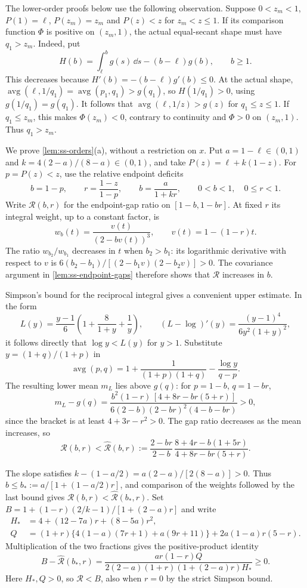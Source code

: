  The lower-order proofs below use the following observation.
Suppose $0<z_m<1$, $P(1)=\ell$, $P(z_m)=z_m$ and $P(z)<z$ for $z_m<z\le1$.
If its comparison function $\Phi$ is positive on $(z_m,1)$, the actual equal-secant shape
must have $q_1>z_m$. Indeed, put
\[
 H(b)=\int_\ell^b g(s)\,\dd s-(b-\ell)g(b),\qquad b\ge1.
\]
This decreases because $H'(b)=-(b-\ell)g'(b)\le0$.
At the actual shape, $\operatorname{avg}(\ell,1/q_1)=\operatorname{avg}(p_1,q_1)>g(q_1)$,
so $H(1/q_1)>0$, using $g(1/q_1)=g(q_1)$.
It follows that $\operatorname{avg}(\ell,1/z)>g(z)$ for $q_1\le z\le1$.
If $q_1\le z_m$, this makes $\Phi(z_m)<0$, contrary to continuity and
$\Phi>0$ on $(z_m,1)$. Thus $q_1>z_m$.

 We prove \cref{lem:ss-orders}(a), without a restriction on $x$.
Put $a=1-\ell\in(0,1)$ and $k=4(2-a)/(8-a)\in(0,1)$, and take $P(z)=\ell+k(1-z)$.
For $p=P(z)<z$, use the relative endpoint deficits
\[
 b=1-p,\qquad r=\frac{1-z}{1-p},\qquad
 b=\frac{a}{1+kr},\qquad 0<b<1,\quad 0\le r<1.
\]
Write $\mathcal R(b,r)$ for the endpoint-gap ratio on $[1-b,1-br]$.
At fixed $r$ its integral weight, up to a constant factor, is
\[
 w_b(t)=\frac{v(t)}{(2-bv(t))^3},\qquad v(t)=1-(1-r)t.
\]
The ratio $w_{b_2}/w_{b_1}$ decreases in $t$ when $b_2>b_1$: its logarithmic derivative
with respect to $v$ is $6(b_2-b_1)/[(2-b_1v)(2-b_2v)]>0$.
The covariance argument in \cref{lem:ss-endpoint-gaps} therefore shows that $\mathcal R$
increases in $b$.

Simpson's bound for the reciprocal integral gives a convenient upper estimate. In the form
\[
 L(y)=\frac{y-1}{6}\left(1+\frac8{1+y}+\frac1y\right),\qquad
 (L-\log)'(y)=\frac{(y-1)^4}{6y^2(1+y)^2},
\]
it follows directly that $\log y<L(y)$ for $y>1$.
Substitute $y=(1+q)/(1+p)$ in
\[
 \operatorname{avg}(p,q)=1+\frac1{(1+p)(1+q)}
                         -\frac{\log y}{q-p}.
\]
The resulting lower mean $m_L$ lies above $g(q)$: for $p=1-b$, $q=1-br$,
\[
 m_L-g(q)=\frac{b^2(1-r)\,[4+8r-br(5+r)]}
 {6(2-b)(2-br)^2(4-b-br)}>0,
\]
since the bracket is at least $4+3r-r^2>0$.
The gap ratio decreases as the mean increases, so
\[
 \mathcal R(b,r)<\widehat{\mathcal R}(b,r):=
 \frac{2-br}{2-b}\,
 \frac{8+4r-b(1+5r)}{4+8r-br(5+r)}.
\]

The slope satisfies
$k-(1-a/2)=a(2-a)/[2(8-a)]>0$.
Thus $b\le b_*:=a/[1+(1-a/2)r]$, and comparison of the weights followed by the last bound gives
$\mathcal R(b,r)<\widehat{\mathcal R}(b_*,r)$.
Set $B=1+(1-r)(2/k-1)/[1+(2-a)r]$ and write
\begin{align*}
 H_*&=4+(12-7a)r+(8-5a)r^2,\\
 Q&=(1+r)\{4(1-a)(7r+1)+a(9r+11)\}+2a(1-a)r(5-r).
\end{align*}
Multiplication of the two fractions gives the positive-product identity
\[
 B-\widehat{\mathcal R}(b_*,r)
 =\frac{ar(1-r)Q}{2(2-a)(1+r)(1+(2-a)r)H_*}\ge0.
\]
Here $H_*,Q>0$, so $\mathcal R<B$, also when $r=0$ by the strict Simpson bound.

